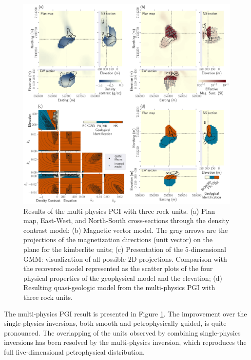 \documentclass[paper, twocolumn]{geophysics} %
\begin{document}
\begin{figure}%
\centering
\includegraphics[width=\textwidth]{Figures/300dpi/Figure12.png}
\caption{Results of the multi-physics PGI with three rock units. (a) Plan map, East-West, and North-South cross-sections through the density contrast model; (b) Magnetic vector model. The gray arrows are the projections of the magnetization directions (unit vector) on the plane for the kimberlite units; (c) Presentation of the $5$-dimensional GMM: visualization of all possible $2$D projections. Comparison with the recovered model represented as the scatter plots of the four physical properties of the geophysical model and the elevation; (d) Resulting quasi-geologic model from the multi-physics PGI with three rock units.}
\label{fig:Figure12.png}
\end{figure}%

The multi-physics PGI result is presented in Figure \ref{fig:Figure12.png}. The improvement over the single-physics inversions, both smooth and petrophysically guided, is quite pronounced. The overlapping of the units observed by combining single-physics inversions has been resolved by the multi-physics inversion, which reproduces the full five-dimensional petrophysical distribution.
\end{document}
